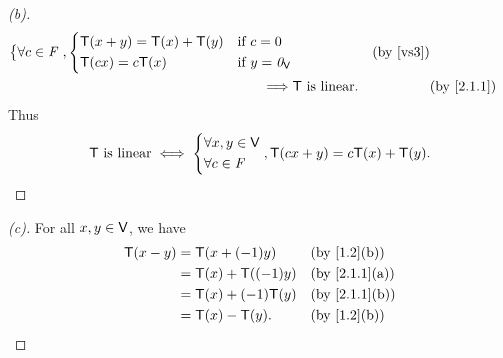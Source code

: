 \begin{proof}[(b)]
\begin{align*}
\begin{dcases}
                 \forall c \in \F
               \end{dcases}, \begin{dcases}
                               \T(x + y) = \T(x) + \T(y) & \text{if } c = 0        \\
                               \T(cx) = c\T(x)           & \text{if } y = \zv_{\V}
                             \end{dcases}             &  & \text{(by \ref{vs3})}                                \\
    \implies & \T \text{ is linear}.                                              &  & \text{(by \cref{2.1.1})}
  \end{align*}
  Thus
  \[
    \mathsf{T} \text{ is linear} \iff \begin{dcases}
      \forall x, y \in \mathsf{V} \\
      \forall c \in \mathit{F}
    \end{dcases}, \mathsf{T}(cx + y) = c\mathsf{T}(x) + \mathsf{T}(y).
  \]
\end{proof}

\begin{proof}[(c)]
  For all \(x, y \in \mathsf{V}\), we have
  \begin{align*}
    \T(x - y) & = \T(x + (-1)y)      &  & \text{(by \cref{1.2}(b))}   \\
              & = \T(x) + \T((-1)y)  &  & \text{(by \cref{2.1.1}(a))} \\
              & = \T(x) + (-1) \T(y) &  & \text{(by \cref{2.1.1}(b))} \\
              & = \T(x) - \T(y).     &  & \text{(by \cref{1.2}(b))}
  \end{align*}
\end{proof}

